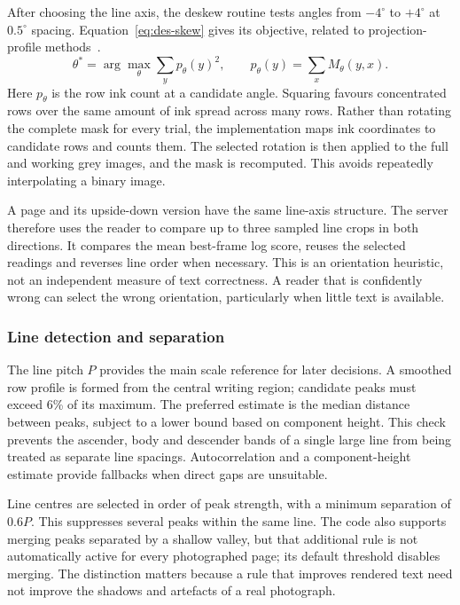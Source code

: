 After choosing the line axis, the deskew routine tests angles from $-4^\circ$ to $+4^\circ$ at $0.5^\circ$ spacing. Equation~\ref{eq:des-skew} gives its objective, related to projection-profile methods~\cite{postl1986}.
\begin{equation}
\theta^*=\arg\max_\theta\sum_y p_\theta(y)^2,\qquad
p_\theta(y)=\sum_x M_\theta(y,x).
\label{eq:des-skew}
\end{equation}
Here $p_\theta$ is the row ink count at a candidate angle. Squaring favours concentrated rows over the same amount of ink spread across many rows. Rather than rotating the complete mask for every trial, the implementation maps ink coordinates to candidate rows and counts them. The selected rotation is then applied to the full and working grey images, and the mask is recomputed. This avoids repeatedly interpolating a binary image.

A page and its upside-down version have the same line-axis structure. The server therefore uses the reader to compare up to three sampled line crops in both directions. It compares the mean best-frame log score, reuses the selected readings and reverses line order when necessary. This is an orientation heuristic, not an independent measure of text correctness. A reader that is confidently wrong can select the wrong orientation, particularly when little text is available.

\subsubsection{Line detection and separation}
The line pitch $P$ provides the main scale reference for later decisions. A smoothed row profile is formed from the central writing region; candidate peaks must exceed 6\% of its maximum. The preferred estimate is the median distance between peaks, subject to a lower bound based on component height. This check prevents the ascender, body and descender bands of a single large line from being treated as separate line spacings. Autocorrelation and a component-height estimate provide fallbacks when direct gaps are unsuitable.

Line centres are selected in order of peak strength, with a minimum separation of $0.6P$. This suppresses several peaks within the same line. The code also supports merging peaks separated by a shallow valley, but that additional rule is not automatically active for every photographed page; its default threshold disables merging. The distinction matters because a rule that improves rendered text need not improve the shadows and artefacts of a real photograph.

